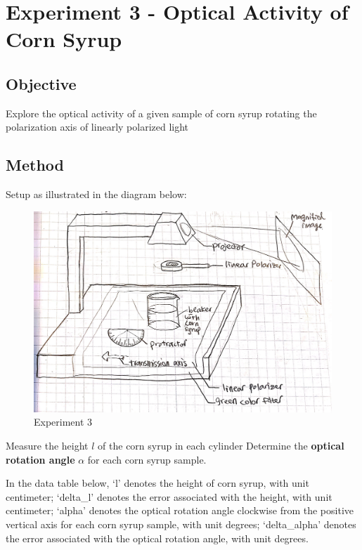 \documentclass[11pt]{article}
\makeatletter
\def\maxwidth{\ifdim\Gin@nat@width>\linewidth\linewidth
    \else\Gin@nat@width\fi}
\let\Oldincludegraphics\includegraphics
\renewcommand{\includegraphics}[1]{\Oldincludegraphics[width=.8\maxwidth]{#1}}
\makeatother
\begin{document}
    \hypertarget{experiment-3---optical-activity-of-corn-syrup}{%
\section{Experiment 3 - Optical Activity of Corn
Syrup}\label{experiment-3---optical-activity-of-corn-syrup}}

\hypertarget{objective}{%
\subsection{Objective}\label{objective}}

Explore the optical activity of a given sample of corn syrup rotating
the polarization axis of linearly polarized light

\hypertarget{method}{%
\subsection{Method}\label{method}}

Setup as illustrated in the diagram below:

\begin{figure}
\centering
\includegraphics{fig1.jpg}
\caption{Experiment 3}
\end{figure}

Measure the height \(l\) of the corn syrup in each cylinder Determine
the \textbf{optical rotation angle} \(\alpha\) for each corn syrup
sample.

In the data table below, `l' denotes the height of corn syrup, with unit
centimeter; `delta\_l' denotes the error associated with the height,
with unit centimeter; `alpha' denotes the optical rotation angle
clockwise from the positive vertical axis for each corn syrup sample,
with unit degrees; `delta\_alpha' denotes the error associated with the
optical rotation angle, with unit degrees.
\end{document}
